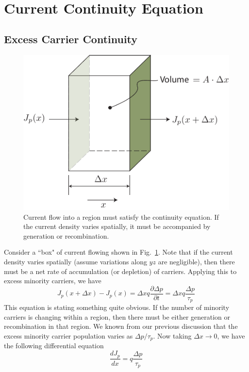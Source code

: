 \section{Current Continuity Equation}



\subsection{Excess Carrier Continuity}



\begin{figure}[tb]
\begin{center}
\includegraphics[width=.65\columnwidth]{Jbox}
\end{center}
\caption{Current flow into a region must satisfy the continuity equation.  If the current density varies spatially, it must be accompanied by generation or recombination. } \label{fig:Jbox}
\end{figure}

Consider a ``box" of current flowing shown in Fig.~\ref{fig:Jbox}.  Note that if the current density varies spatially (assume variations along $yz$ are negligible), then there must be a net rate of accumulation (or depletion) of carriers.  Applying this to excess minority carriers, we have
%
\begin{equation}
	J_p(x + \Delta x) - J_p(x) =  \Delta x q \frac{\partial \Delta p}{\partial t} =  \Delta x q \frac{\Delta p}{\tau_p}
\end{equation}
%
This equation is stating something quite obvious.  If the number of minority carriers is changing within a region, then there must be either generation or recombination in that region.  We known from our previous discussion that the excess minority carrier population varies as $\Delta p/\tau_p$.
%
Now taking $\Delta x \rightarrow 0$, we have the following differential equation
\begin{equation}
	\frac{dJ_p}{dx}  = q \frac{\Delta p}{\tau_p}
\end{equation}

